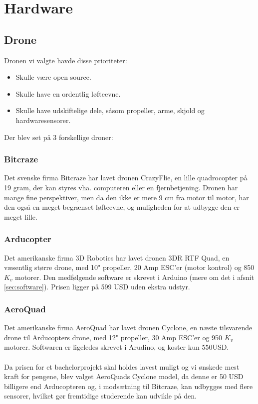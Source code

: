 \documentclass[Main]{subfiles}
\begin{document}
\chapter{Hardware}


\section{Drone}
Dronen vi valgte havde disse prioriteter:
\begin{itemize}
\item Skulle være open source.
\item Skulle have en ordentlig løfteevne.
\item Skulle have udskiftelige dele, såsom propeller, arme, skjold og hardwaresensorer.
\end{itemize}

Der blev set på 3 forskellige droner:
\subsection{Bitcraze}
Det svenske firma Bitcraze har lavet dronen CrazyFlie\cite{BitCraze}, en lille quadrocopter på 19 gram, der kan styres vha. computeren eller en fjernbetjening.
Dronen har mange fine perspektiver, men da den ikke er mere 9 cm fra motor til motor, har den også en meget begrænset løfteevne, og muligheden for at udbygge den er meget lille.

\subsection{Arducopter}
Det amerikanske firma 3D Robotics har lavet dronen 3DR RTF Quad\cite{ArduCopter}, en væsentlig større drone, med 10" propeller, 20 Amp ESC'er (motor kontrol) og 850 $K_v$\cite{Kv} motorer.
Den medfølgende software er skrevet i Arduino (mere om det i afsnit \ref{sec:software}). 
Prisen ligger på 599 USD uden ekstra udstyr.

\subsection{AeroQuad}
Det amerikanske firma AeroQuad har lavet dronen Cyclone\cite{AQ-store}, en næste tilsvarende drone til Arducopters drone, med 12" propeller, 30 Amp ESC'er og 950 $K_v$\cite{Kv} motorer.
Softwaren er ligeledes skrevet i Arudino, og koster kun 550USD.
\\
\\
Da prisen for et bachelorprojekt skal holdes lavest muligt og vi ønskede mest kraft for pengene, blev valget AeroQuads Cyclone model, da denne er 50 USD billigere end Arducopteren og, i modsætning til Bitcraze, kan udbygges med flere sensorer, hvilket gør fremtidige studerende kan udvikle på den.
\end{document}

